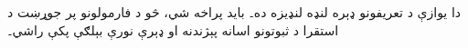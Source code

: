 \documentclass[../../../include/open-logic-chapter]{subfiles}
\begin{document}

\begin{editorial}
  دا يوازې د تعريفونو ډېره لنډه لنډيزه ده۔ بايد پراخه شي، څو د
  فارمولونو پر جوړښت د استقرا د ثبوتونو اسانه پېژندنه او ډېرې نورې
  بېلګې پکې راشي۔
\end{editorial}







\OLEndChapterHook
\end{document}
